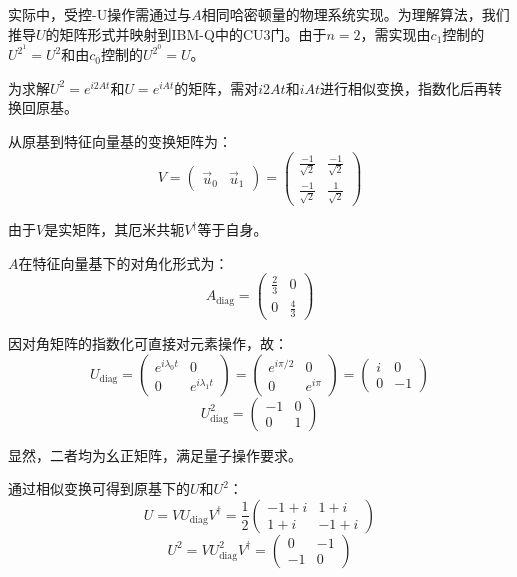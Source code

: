 \documentclass{article}
\begin{document}
实际中，受控-U操作需通过与\(A\)相同哈密顿量的物理系统实现。为理解算法，我们推导\(U\)的矩阵形式并映射到IBM-Q中的CU3门。由于\(n=2\)，需实现由\(c_1\)控制的\(U^{2^1} = U^2\)和由\(c_0\)控制的\(U^{2^0} = U\)。

为求解\(U^2 = e^{i2At}\)和\(U = e^{iAt}\)的矩阵，需对\(i2At\)和\(iAt\)进行相似变换，指数化后再转换回原基。

从原基到特征向量基的变换矩阵为：
\[
V = \begin{pmatrix} \vec{u}_0 & \vec{u}_1 \end{pmatrix} = \begin{pmatrix} \frac{-1}{\sqrt{2}} & \frac{-1}{\sqrt{2}} \\ \frac{-1}{\sqrt{2}} & \frac{1}{\sqrt{2}} \end{pmatrix}
\]

由于\(V\)是实矩阵，其厄米共轭\(V^\dagger\)等于自身。

\(A\)在特征向量基下的对角化形式为：
\[
A_{\text{diag}} = \begin{pmatrix} \frac{2}{3} & 0 \\ 0 & \frac{4}{3} \end{pmatrix}
\]

因对角矩阵的指数化可直接对元素操作，故：
\[
U_{\text{diag}} = \begin{pmatrix} e^{i\lambda_0 t} & 0 \\ 0 & e^{i\lambda_1 t} \end{pmatrix} = \begin{pmatrix} e^{i\pi/2} & 0 \\ 0 & e^{i\pi} \end{pmatrix} = \begin{pmatrix} i & 0 \\ 0 & -1 \end{pmatrix}
\]
\[
U_{\text{diag}}^2 = \begin{pmatrix} -1 & 0 \\ 0 & 1 \end{pmatrix}
\]

显然，二者均为幺正矩阵，满足量子操作要求。

通过相似变换可得到原基下的\(U\)和\(U^2\)：
\[
U = V U_{\text{diag}} V^\dagger = \frac{1}{2} \begin{pmatrix} -1+i & 1+i \\ 1+i & -1+i \end{pmatrix} 
\]
\[
U^2 = V U_{\text{diag}}^2 V^\dagger = \begin{pmatrix} 0 & -1 \\ -1 & 0 \end{pmatrix}
\]
\end{document}
